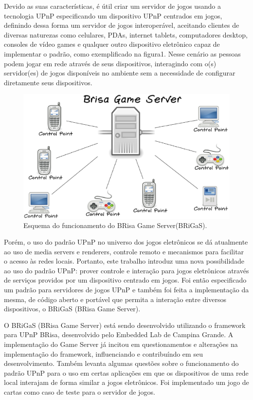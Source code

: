 \documentclass[a4paper]{sbgames}               %
\begin{document}
Devido as suas características, é útil criar um servidor de jogos usando a tecnologia UPnP especificando um dispositivo UPnP centrados em jogos, definindo dessa forma um servidor de jogos interoperável, aceitando clientes de diversas naturezas como celulares, PDAs, internet tablets, computadores desktop, consoles de vídeo games e qualquer outro dispositivo eletrônico capaz de implementar o padrão, como exemplificado na figura1. Nesse cenário as pessoas podem jogar em rede através de seus dispositivos, interagindo com o(s) servidor(es) de jogos disponíveis no ambiente sem a necessidade de configurar diretamente seus dispositivos.

\begin{figure}[h!]
    \centering
    \includegraphics[scale=0.35]{images/brisa-game-server.eps}
    \caption{Esquema do funcionamento do BRisa Game Server(BRiGaS).}
    \label{fig:avschema_new}
\vspace{-5mm}
\end{figure}
\vspace{3mm}
\normalsize

Porém, o uso do padrão UPnP no universo dos jogos eletrônicos se dá atualmente ao uso de media servers e renderers, controle remoto e mecanismos para facilitar o acesso às redes locais.  Portanto, este trabalho introduz uma nova possibilidade ao uso do padrão UPnP: prover controle e interação para jogos eletrônicos através de serviços providos por um dispositivo centrado em jogos. Foi então especificado um padrão para servidores de jogos UPnP e também foi feita a implementação da mesma, de código aberto e portável que permita a interação entre diversos 
dispositivos, o BRiGaS (BRisa Game Server).

O BRiGaS (BRisa Game Server) está sendo desenvolvido utilizando o framework para UPnP BRisa, desenvolvido pelo Embedded Lab de Campina Grande. A implementação do Game Server já incitou em questionamentos e alterações na implementação do framework, influenciando e contribuíndo em seu desenvolvimento. Também levanta algumas questões sobre o funcionamento do padrão UPnP para o uso em certas aplicações em que os dispositivos de uma rede local interajam de forma similar a jogos eletrônicos. Foi implementado um jogo de cartas como caso de teste para o servidor de jogos.
\end{document}
